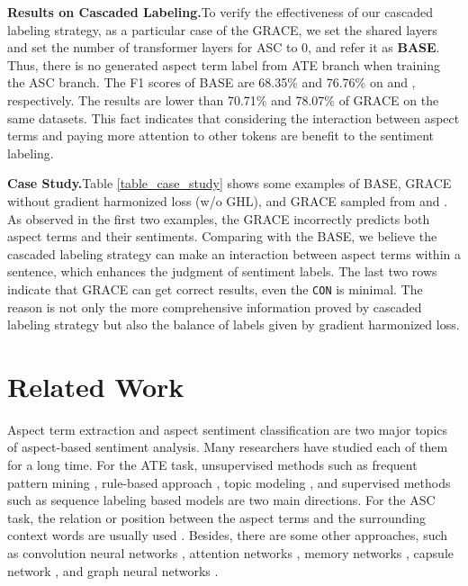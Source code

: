 \documentclass[11pt,a4paper]{article}
\begin{document}
\vspace{+1mm}
\noindent
\textbf{Results on Cascaded Labeling.}\quad To verify the effectiveness of our cascaded labeling strategy, as a particular case of the GRACE, we set the shared layers  and set the number of transformer layers for ASC to 0, and refer it as \textbf{BASE}. Thus, there is no generated aspect term label from ATE branch when training the ASC branch. The F1 scores of BASE are 68.35\% and 76.76\% on  and , respectively. The results are lower than 70.71\% and 78.07\% of GRACE on the same datasets. This fact indicates that considering the interaction between aspect terms and paying more attention to other tokens are benefit to the sentiment labeling.

\vspace{+1mm}
\noindent
\textbf{Case Study.}\quad Table \ref{table_case_study} shows some examples of BASE, GRACE without gradient harmonized loss (w/o GHL), and GRACE sampled from  and . As observed in the first two examples, the GRACE  incorrectly predicts both aspect terms and their sentiments. Comparing with the BASE, we believe the cascaded labeling strategy can make an interaction between aspect terms within a sentence, which enhances the judgment of sentiment labels. The last two rows indicate that GRACE can get correct results, even the \texttt{CON} is minimal. The reason is not only the more comprehensive information proved by cascaded labeling strategy but also the balance of labels given by gradient harmonized loss.

\section{Related Work}
\label{sec_related_work}
Aspect term extraction and aspect sentiment classification are two major topics of aspect-based sentiment analysis. Many researchers have studied each of them for a long time. For the ATE task, unsupervised methods such as frequent pattern mining \cite{Hu2004}, rule-based approach \cite{Qiu2011, Liu2015Automated}, topic modeling \cite{He2011auto, Chen2014Aspect}, and supervised methods such as sequence labeling based models \cite{Wang2016a,Yin2016,Xu2018,Li2018a,Luo2019a,Ma2019} are two main directions. For the ASC task, the relation or position between the aspect terms and the surrounding context words are usually used \cite{Tang2016a,Arjun2016extract}. Besides, there are some other approaches, such as convolution neural networks \cite{Poria2016aspect,Li2018}, attention networks \cite{Wang2016attention,Ma2017a,He2017}, memory networks \cite{Wang2018a}, capsule network \cite{Chen2019}, and graph neural networks \cite{Wang2020}.
\end{document}
